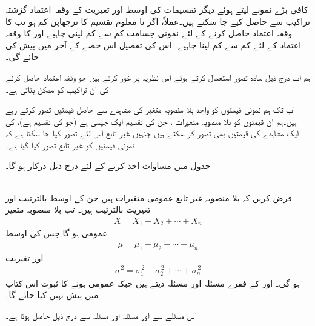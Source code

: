کافی بڑے نمونے لیتے ہوئے دیگر تقسیمات کی اوسط اور تغیریت کے وقفہ اعتماد گزشتہ تراکیب سے حاصل کیے جا سکتے ہیں۔عملاً، اگر نا معلوم تقسیم کا ترچھاپن کم ہو تب  کا وقفہ اعتماد حاصل کرنے کے لئے  نمونی جسامت کم سے کم  لینی چاہیے  اور  کا وقفہ اعتماد کے لئے کم سے کم  لینا چاہیے۔ اس  کی تفصیل اس حصے کے آخر میں پیش کی جائے گی۔

ہم اب درج ذیل سادہ تصور استعمال کرتے ہوئے اس نظریہ پر غور کرتے ہیں جو وقفہ اعتماد حاصل کرنے کی ان تراکیب کو ممکن بناتی ہے۔

اب تک ہم نمونی قیمتوں  کو واحد بلا منصوبہ متغیر  کی  مشاہدے سے حاصل  قیمتیں تصور کرتے رہے ہیں۔ہم ان  قیمتوں کو  بلا منصوبہ متغیرات ، جن کی تقسیم ایک جیسی ہے (جو  کی تقسیم ہے)، کی  ایک مشاہدے کی قیمتیں بھی تصور کر سکتے ہیں جنہیں غیر تابع اس لئے تصور کیا جا سکتا ہے کہ نمونی قیمتیں کو غیر تابع تصور کیا گیا ہے۔

 جدول  میں مساوات  اخذ کرنے  کے لئے درج ذیل درکار ہو گا۔

\quad {}\\
فرض کریں کہ  بلا منصوبہ غیر تابع عمومی متغیرات ہیں جن کے اوسط بالترتیب  اور تغیریت بالترتیب  ہیں۔ تب بلا منصوبہ متغیر
\begin{align*}
X=X_1+X_2+\cdots+X_n
\end{align*}
عمومی ہو گا جس کی اوسط
\begin{align*}
\mu=\mu_1+\mu_2+\cdots+\mu_n
\end{align*}
اور تغیریت
\begin{align*}
\sigma^{\,2}=\sigma^{\,2}_1+\sigma^{\,2}_2+\cdots+\sigma^{\,2}_n
\end{align*}
ہو گی۔ اور  کے فقرے مسئلہ  اور مسئلہ  دیتے ہیں جبکہ  عمومی ہونے کا ثبوت اس کتاب میں پیش نہیں کیا جائے گا۔

اس مسئلے سے اور مسئلہ  اور مسئلہ  سے درج ذیل حاصل ہوتا ہے۔


